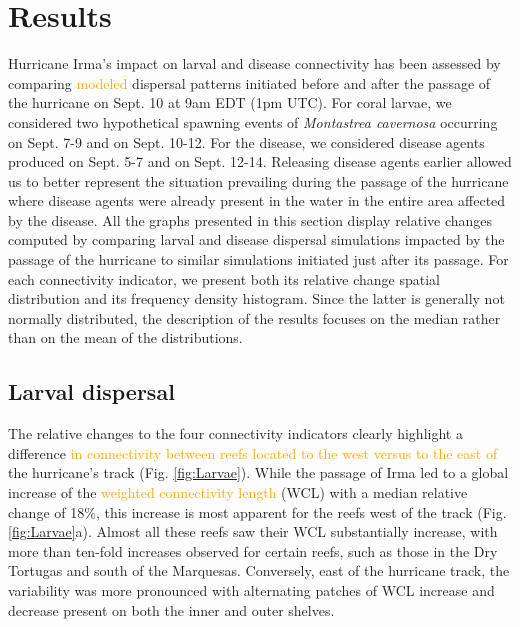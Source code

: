 \documentclass[fleqn,10pt]{wlscirep}
\newcommand{\modif}[1]{\textcolor{orange}{#1}}
\begin{document}
\section{Results}
Hurricane Irma's impact on larval and disease connectivity has been assessed by comparing \modif{modeled} dispersal patterns initiated before and after the passage of the hurricane on Sept. 10 at 9am EDT (1pm UTC). For coral larvae, we considered two hypothetical spawning events of {\it Montastrea cavernosa} occurring on Sept. 7-9 and on Sept. 10-12. For the disease, we considered disease agents produced on Sept. 5-7 and on Sept. 12-14. Releasing disease agents earlier allowed us to better represent the situation prevailing during the passage of the hurricane where disease agents were already present in the water in the entire area affected by the disease. All the graphs presented in this section display relative changes computed by comparing larval and disease dispersal simulations impacted by the passage of the hurricane to similar simulations initiated just after its passage. For each connectivity indicator, we present both its relative change spatial distribution and its frequency density histogram. Since the latter is generally not normally distributed, the description of the results focuses on the median rather than on the mean of the distributions.

\subsection{Larval dispersal}
The relative changes to the four connectivity indicators clearly highlight a difference \modif{in connectivity between reefs located to the west versus to the east of} the hurricane's track (Fig. \ref{fig:Larvae}). While the passage of Irma led to a global increase of the \modif{weighted connectivity length} (WCL) with a median relative change of 18\%, this increase is most apparent for the reefs west of the track (Fig. \ref{fig:Larvae}a). Almost all these reefs saw their WCL substantially increase, with more than ten-fold increases observed for certain reefs, such as those in the Dry Tortugas and south of the Marquesas. Conversely, east of the hurricane track, the variability was more pronounced with alternating patches of WCL increase and decrease present on both the inner and outer shelves.
\end{document}
